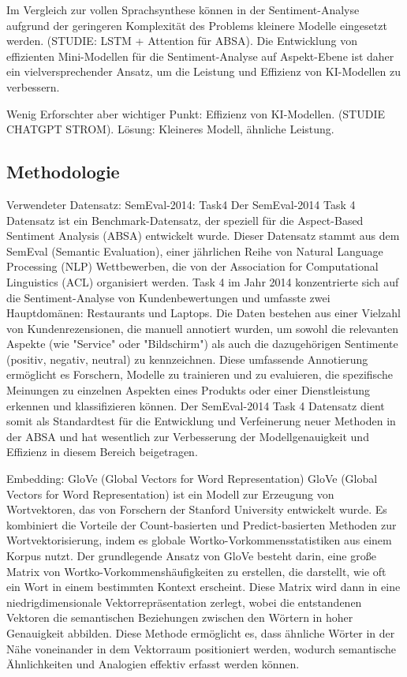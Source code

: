 \documentclass[12pt]{article}
\begin{document}
Im Vergleich zur vollen Sprachsynthese können in der Sentiment-Analyse aufgrund der geringeren Komplexität des Problems kleinere Modelle eingesetzt werden. 
(STUDIE: LSTM + Attention für ABSA). Die Entwicklung von effizienten Mini-Modellen für die Sentiment-Analyse auf Aspekt-Ebene ist daher ein vielversprechender Ansatz,
um die Leistung und Effizienz von KI-Modellen zu verbessern.

Wenig Erforschter aber wichtiger Punkt: Effizienz von KI-Modellen. (STUDIE CHATGPT STROM). Lösung: Kleineres Modell, ähnliche Leistung.
\subsection{Methodologie}

Verwendeter Datensatz: SemEval-2014: Task4
Der SemEval-2014 Task 4 Datensatz ist ein Benchmark-Datensatz, der speziell für die Aspect-Based Sentiment Analysis (ABSA) entwickelt wurde. Dieser Datensatz stammt aus dem SemEval (Semantic Evaluation), einer jährlichen Reihe von Natural Language Processing (NLP) Wettbewerben, die von der Association for Computational Linguistics (ACL) organisiert werden. Task 4 im Jahr 2014 konzentrierte sich auf die Sentiment-Analyse von Kundenbewertungen und umfasste zwei Hauptdomänen: Restaurants und Laptops. Die Daten bestehen aus einer Vielzahl von Kundenrezensionen, die manuell annotiert wurden, um sowohl die relevanten Aspekte (wie "Service" oder "Bildschirm") als auch die dazugehörigen Sentimente (positiv, negativ, neutral) zu kennzeichnen. Diese umfassende Annotierung ermöglicht es Forschern, Modelle zu trainieren und zu evaluieren, die spezifische Meinungen zu einzelnen Aspekten eines Produkts oder einer Dienstleistung erkennen und klassifizieren können. Der SemEval-2014 Task 4 Datensatz dient somit als Standardtest für die Entwicklung und Verfeinerung neuer Methoden in der ABSA und hat wesentlich zur Verbesserung der Modellgenauigkeit und Effizienz in diesem Bereich beigetragen.

Embedding: GloVe (Global Vectors for Word Representation)
GloVe (Global Vectors for Word Representation) ist ein Modell zur Erzeugung von Wortvektoren, das von Forschern der Stanford University entwickelt wurde. Es kombiniert die Vorteile der Count-basierten und Predict-basierten Methoden zur Wortvektorisierung, indem es globale Wortko-Vorkommensstatistiken aus einem Korpus nutzt. Der grundlegende Ansatz von GloVe besteht darin, eine große Matrix von Wortko-Vorkommenshäufigkeiten zu erstellen, die darstellt, wie oft ein Wort in einem bestimmten Kontext erscheint. Diese Matrix wird dann in eine niedrigdimensionale Vektorrepräsentation zerlegt, wobei die entstandenen Vektoren die semantischen Beziehungen zwischen den Wörtern in hoher Genauigkeit abbilden. Diese Methode ermöglicht es, dass ähnliche Wörter in der Nähe voneinander in dem Vektorraum positioniert werden, wodurch semantische Ähnlichkeiten und Analogien effektiv erfasst werden können.
\end{document}
